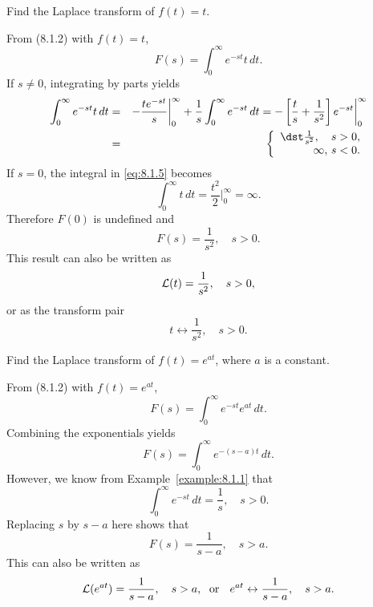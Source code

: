 \setcounter{example}{1}
\begin{example}
  \label{example:8.1.2}\rm Find the Laplace transform of $f(t)=t$.
\end{example}
\setcounter{equation}{4}
\begin{examplesolution}
\solution From \textup{(8.1.2)} with $f(t)=t$,
\begin{equation}
  \label{eq:8.1.5}F(s)=\int_{0}^{\infty}e^{-st}t\,dt.
\end{equation}
If $s\ne0$, integrating by parts yields
\begin{eqnarray*}
  \int_{0}^{\infty}e^{-st}t\,dt&=&-\frac{te^{-st}}{s}\bigg|_{0}^{\infty} +\frac{1}{s}\int_{0}^{\infty}e^{-st}\,dt =-\left[\frac{t}{s}+\frac{1}{s^{2}}\right]e^{-st}\bigg|_{0}^{\infty} \\&=&\left\{
  \begin{array}{rr}
    \dst\frac{1}{s^{2}},\quad s>0, \\
    \infty,\,s<0.
  \end{array}\right.
\end{eqnarray*}
If $s=0$, the integral in \eqref{eq:8.1.5} becomes
\[
  \int_{0}^{\infty}t\,dt=\frac{t^{2}}{2}\bigg|_{0}^{\infty}=\infty.
\]
Therefore $F(0)$ is undefined and
\[
  F(s)=\frac{1}{s^{2}},\quad s>0.
\]
This result can also be written as
\[
  {\cal L}(t)=\frac{1}{s^{2}},\quad s>0,
\]
or as the transform pair
\[
  t\leftrightarrow\frac{1}{s^{2}},\quad s>0.
\]
\end{examplesolution}

\setcounter{example}{2}
\begin{example}
  \label{example:8.1.3}\rm Find the Laplace transform of $f(t)=e^{at}$, where $a$ is a constant.
\end{example}
\begin{examplesolution}
\solution From \textup{(8.1.2)} with $f(t)=e^{at}$,
\[
  F(s)=\int_{0}^{\infty}e^{-st}e^{at}\,dt.
\]
Combining the exponentials yields
\[
  F(s)=\int_{0}^{\infty}e^{-(s-a)t}\,dt.
\]
However, we know from Example~\ref{example:8.1.1} that
\[
  \int_{0}^{\infty}e^{-st}\,dt=\frac{1}{s},\quad s>0.
\]
Replacing $s$ by $s-a$ here shows that
\[
  F(s)=\frac{1}{s-a},\quad s>a.
\]
This can also be written as
\[
  {\cal L}(e^{at})=\frac{1}{s-a},\quad s>a,\text{\; or \; }e^{at}\leftrightarrow\frac{1}{s-a},\quad s>a.
\]
\end{examplesolution}

